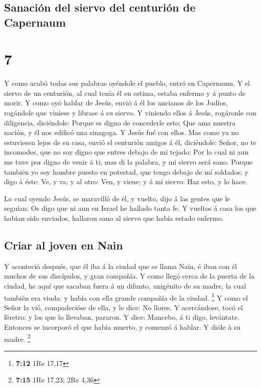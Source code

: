 \hypertarget{sanaciuxf3n-del-siervo-del-centuriuxf3n-de-capernaum}{%
\subsection{Sanación del siervo del centurión de
Capernaum}\label{sanaciuxf3n-del-siervo-del-centuriuxf3n-de-capernaum}}

\hypertarget{section-6}{%
\section{7}\label{section-6}}

 Y como acabó todas sus palabras oyéndole el pueblo, entró
en Capernaum.  Y el siervo de un centurión, al cual tenía
él en estima, estaba enfermo y á punto de morir.  Y como
oyó hablar de Jesús, envió á él los ancianos de los Judíos, rogándole
que viniese y librase á su siervo.  Y viniendo ellos á
Jesús, rogáronle con diligencia, diciéndole: Porque es digno de
concederle esto;  Que ama nuestra nación, y él nos edificó
una sinagoga.  Y Jesús fué con ellos. Mas como ya no
estuviesen lejos de su casa, envió el centurión amigos á él, diciéndole:
Señor, no te incomodes, que no soy digno que entres debajo de mi tejado;
 Por lo cual ni aun me tuve por digno de venir á ti; mas
di la palabra, y mi siervo será sano.  Porque también yo
soy hombre puesto en potestad, que tengo debajo de mí soldados; y digo á
éste: Ve, y va; y al otro: Ven, y viene; y á mi siervo: Haz esto, y lo
hace.

 Lo cual oyendo Jesús, se maravilló de él, y vuelto, dijo
á las gentes que le seguían: Os digo que ni aun en Israel he hallado
tanta fe.  Y vueltos á casa los que habían sido enviados,
hallaron sano al siervo que había estado enfermo.

\hypertarget{criar-al-joven-en-nain}{%
\subsection{Criar al joven en Nain}\label{criar-al-joven-en-nain}}

 Y aconteció después, que él iba á la ciudad que se llama
Naín, é iban con él muchos de sus discípulos, y gran compañía.
 Y como llegó cerca de la puerta de la ciudad, he aquí
que sacaban fuera á un difunto, unigénito de su madre, la cual también
era viuda: y había con ella grande compañía de la ciudad. \footnote{\textbf{7:12}
  1Re 17,17}  Y como el Señor la vió, compadecióse de
ella, y le dice: No llores.  Y acercándose, tocó el
féretro: y los que lo llevaban, pararon. Y dice: Mancebo, á ti digo,
levántate.  Entonces se incorporó el que había muerto, y
comenzó á hablar. Y dióle á su madre. \footnote{\textbf{7:15} 1Re 17,23;
  2Re 4,36}

